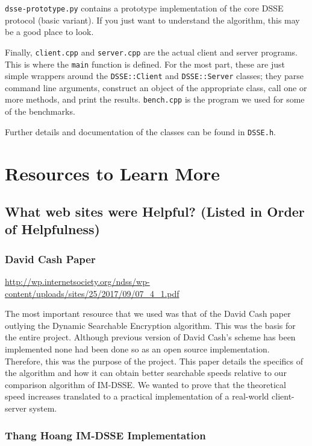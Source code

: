 \texttt{dsse-prototype.py} contains a prototype implementation of the core DSSE protocol (basic variant).
If you just want to understand the algorithm, this may be a good place to look.

Finally, \texttt{client.cpp} and \texttt{server.cpp} are the
actual client and server programs. This is where the \texttt{main} function is
defined.
For the most part, these are just simple wrappers around the
\texttt{DSSE::Client} and \texttt{DSSE::Server} classes;
they parse command line arguments, construct an object of the appropriate class,
call one or more methods, and print the results.
\texttt{bench.cpp} is the program we used for some of the benchmarks.

Further details and documentation of the classes can be found in \texttt{DSSE.h}.

\section{Resources to Learn More}

\subsection{What web sites were Helpful? (Listed in Order of Helpfulness)}

\subsubsection{David Cash Paper}

\url{http://wp.internetsociety.org/ndss/wp-content/uploads/sites/25/2017/09/07_4_1.pdf}

The most important resource that we used was that of the David Cash paper outlying the Dynamic Searchable Encryption algorithm. This was the basis for the entire project. Although previous version of David Cash’s scheme has been implemented none had been done so as an open source implementation. Therefore, this was the purpose of the project. This paper details the specifics of the algorithm and how it can obtain better searchable speeds relative to our comparison algorithm of IM-DSSE. We wanted to prove that the theoretical speed increases translated to a practical implementation of a real-world client-server system.

\subsubsection{Thang Hoang IM-DSSE Implementation}

